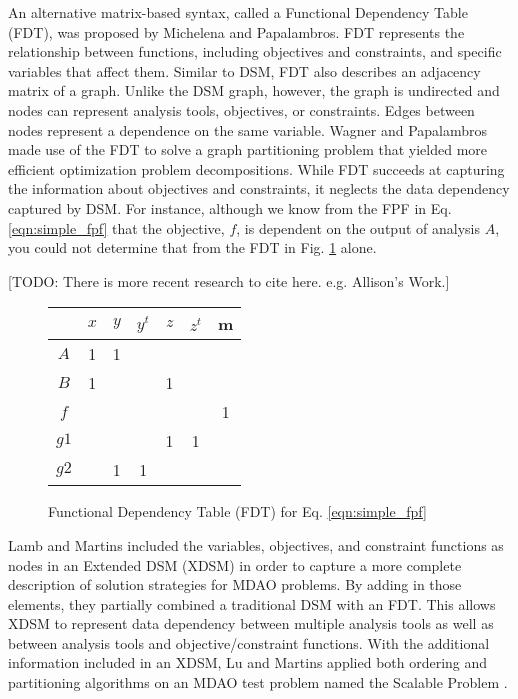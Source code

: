     An alternative matrix-based syntax, called a Functional Dependency Table (FDT), was proposed by Michelena and Papalambros. 
    FDT represents the relationship between functions, including objectives and constraints, and specific variables that affect 
    them\cite{Michelena1997}. Similar to DSM, FDT also describes an adjacency matrix of a graph. Unlike the DSM graph, 
    however, the graph is undirected and nodes can represent analysis tools, objectives, 
    or constraints. Edges between nodes represent a dependence on the same 
    variable. Wagner and Papalambros made use of the FDT to solve a graph partitioning problem that yielded 
    more efficient optimization problem decompositions\cite{Wagner1993}. While FDT succeeds at capturing the 
    information about objectives and constraints, it neglects the data dependency captured by DSM. For instance, 
    although we know from the FPF in Eq. \ref{eqn:simple_fpf} that the objective, $f$, is dependent on the 
    output of analysis $A$, you could not determine that from the FDT in Fig. \ref{fig:FDT_simple} alone. 
    
    [TODO: There is more recent research to cite here. e.g. Allison's Work.]

    \begin{figure}
        \begin{center}
        \begin{tabular}{|c|c|c|c|c|c|c|}
            \hline
                 & $x$ & $y$ & $y^t$ & $z$ & $z^t$ & m \\ \hline
            $A$  & 1  & 1    &       &     &       &   \\ \hline
            $B$  & 1  &      &       & 1   &       &   \\ \hline
            $f$  &    &      &       &     &       & 1 \\ \hline
            $g1$ &    &      &       & 1   & 1     &   \\ \hline
            $g2$ &    & 1    & 1     &     &       &   \\
            \hline
        \end{tabular}
        \caption{Functional Dependency Table (FDT) for Eq. \ref{eqn:simple_fpf} \label{fig:FDT_simple}}
        \end{center}
    \end{figure}

    Lamb and Martins included the variables, objectives, and constraint functions as nodes in an Extended 
    DSM (XDSM) in order to capture a more complete description of solution strategies for MDAO problems\cite{Lambe2012}. By adding in those 
    elements, they partially combined a traditional DSM with an FDT. 
    This allows XDSM to represent data dependency between multiple analysis tools as well as between analysis tools and
    objective/constraint functions. With the additional information included in an XDSM, Lu and Martins applied both ordering and partitioning 
    algorithms on an MDAO test problem named the Scalable Problem \cite{Lu2012}. 


